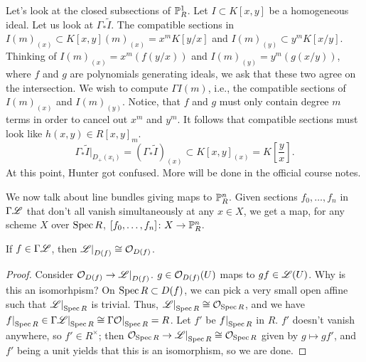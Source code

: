 Let's look at the closed subsections of $\mathbb P^1_R$. Let $I \subset K[x, y]$ be a homogeneous ideal. Let us look at $\Gamma_\ast \tilde I$. The compatible sections in $I(m)_{(x)} \subset K[x, y](m)_{(x)} = x^m K[y/x]$ and $I(m)_{(y)} \subset y^m K[x/y]$. Thinking of $I(m)_{(x)} = x^m(f(y/x))$ and $I(m)_{(y)} = y^m(g(x/y))$, where $f$ and $g$ are polynomials generating ideals, we ask that these two agree on the intersection. We wish to compute $\Gamma I(m)$, i.e., the compatible sections of $I(m)_{(x)}$ and $I(m)_{(y)}$. Notice, that $f$ and $g$ must only contain degree $m$ terms in order to cancel out $x^m$ and $y^m$. It follows that compatible sections must look like $h(x, y) \in R[x, y]_m$.
\[ \Gamma_\ast \tilde I \bigr\rvert_{D_+(x_i)} = (\Gamma_\ast \tilde I)_{(x)} \subset K[x, y]_{(x)} = K\left[\frac{y}{x}\right]. \]
{\color{amethyst} At this point, Hunter got confused. More will be done in the official course notes.}

We now talk about line bundles giving maps to $\mathbb P_R^n$. Given sections $f_0, \dots, f_n$ in $\Gamma \mathscr L$ that don't all vanish simultaneously at any $x \in X$, we get a map, for any scheme $X$ over $\operatorname{Spec} R$, $[f_0, \dots, f_n] \colon X \to \mathbb P_R^n$.
\begin{theorem} \label{thm:line_bundle_sheaf}
    If $f \in \Gamma \mathscr L$, then $\restr{\SCL}{D(f)} \cong \SO_{D(f)}$.
\end{theorem}
\begin{proof}
    Consider $\SO_{D(f)} \to \restr{\SCL}{D(f)}$. $g \in \mathcal O_{D(f)}(U)$ maps to $gf \in \mathscr L(U)$. Why is this an isomorhpism? On $\operatorname{Spec} R \subset D(f)$, we can pick a very small open affine such that $\restr{\SCL}{\Spec R}$ is trivial. Thus, $\restr{\SCL}{\Spec R} \cong \SO_{\Spec R}$, and we have $\restr{f}{\Spec R} \in \restr{\Gamma \SCL}{\Spec R} \cong \restr{\Gamma \SO}{\Spec R} = R$. Let $f'$ be $\restr{f}{\Spec R}$ in $R$. $f'$ doesn't vanish anywhere, so $f' \in R^\times$; then $\SO_{\Spec R} \to \restr{\SCL}{\Spec R} \cong \SO_{\Spec R}$ given by $g \mapsto g f'$, and $f'$ being a unit yields that this is an isomorphism, so we are done.
\end{proof}

